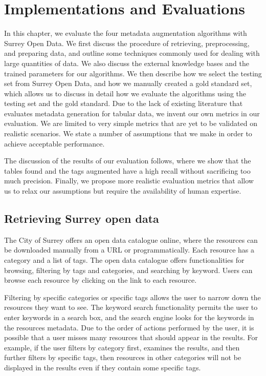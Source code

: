 
\chapter{Implementations and Evaluations}
\label{ch:Implementations}

In this chapter, we evaluate the four metadata augmentation algorithms with Surrey Open Data. We first discuss the procedure of retrieving, preprocessing, and preparing data, and outline some techniques commonly used for dealing with large quantities of data. We also discuss the external knowledge bases and the trained parameters for our algorithms. We then describe how we select the testing set from Surrey Open Data, and how we manually created a gold standard set, which allows us to discuss in detail how we evaluate the algorithms using the testing set and the gold standard. Due to the lack of existing literature that evaluates metadata generation for tabular data, we invent our own metrics in our evaluation. We are limited to very simple metrics that are yet to be validated on realistic scenarios. We state a number of assumptions that we make in order to achieve acceptable performance.

The discussion of the results of our evaluation follows, where we show that the tables found and the tags augmented have a high recall without sacrificing too much precision. Finally, we propose more realistic evaluation metrics that allow us to relax our assumptions but require the availability of human expertise.

\section{Retrieving Surrey open data}
\label{sec:RetrievingSurreyOpenData}

The City of Surrey offers an open data catalogue online, where the resources can be downloaded manually from a URL or programmatically. Each resource has a category and a list of tags. The open data catalogue offers functionalities for browsing, filtering by tags and categories, and searching by keyword. Users can browse each resource by clicking on the link to each resource.

Filtering by specific categories or specific tags allows the user to narrow down the resources they want to see. The keyword search functionality permits the user to enter keywords in a search box, and the search engine looks for the keywords in the resources metadata. Due to the order of actions performed by the user, it is possible that a user misses many resources that should appear in the results. For example, if the user filters by category first, examines the results, and then further filters by specific tags, then resources in other categories will not be displayed in the results even if they contain some specific tags.

